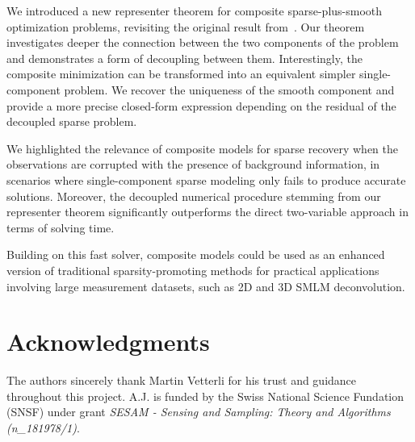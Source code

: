 \documentclass[12pt]{article}
\begin{document}
    We introduced a new representer theorem for composite sparse-plus-smooth optimization problems, revisiting the original result from~\cite{debarre2021continuous}. Our theorem investigates deeper the connection between the two components of the problem and demonstrates a form of decoupling between them. Interestingly, the composite minimization can be transformed into an equivalent simpler single-component problem. We recover the uniqueness of the smooth component and provide a more precise closed-form expression depending on the residual of the decoupled sparse problem.

    We highlighted the relevance of composite models for sparse recovery when the observations are corrupted with the presence of background information, in scenarios where single-component sparse modeling only fails to produce accurate solutions. Moreover, the decoupled numerical procedure stemming from our representer theorem significantly outperforms the direct two-variable approach in terms of solving time.

    Building on this fast solver, composite models could be used as an enhanced version of traditional sparsity-promoting methods for practical applications involving large measurement datasets, such as 2D and 3D SMLM deconvolution.

\section*{Acknowledgments}
    The authors sincerely thank Martin Vetterli for his trust and guidance throughout this project.   
    A.J. is funded by the Swiss National Science Fundation (SNSF) under grant \emph{SESAM - Sensing and Sampling: Theory and Algorithms (n\_181978/1)}.
    




\end{document}
